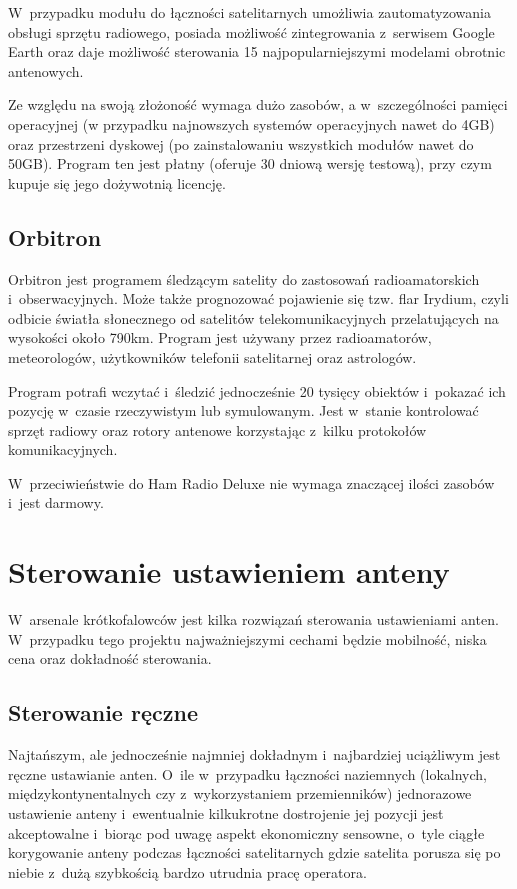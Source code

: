 \documentclass[eng,oneside]{mgr}
\begin{document}
			W~przypadku modułu do łączności satelitarnych umożliwia zautomatyzowania obsługi sprzętu radiowego, posiada możliwość zintegrowania z~serwisem Google Earth oraz daje możliwość sterowania 15 najpopularniejszymi modelami obrotnic antenowych.

			Ze względu na swoją złożoność wymaga dużo zasobów, a w~szczególności pamięci operacyjnej (w przypadku najnowszych systemów operacyjnych nawet do 4GB) oraz przestrzeni dyskowej (po zainstalowaniu wszystkich modułów nawet do 50GB). Program ten jest płatny (oferuje 30 dniową wersję testową), przy czym kupuje się jego dożywotnią licencję.

			\subsection{Orbitron}
			Orbitron jest programem śledzącym satelity do zastosowań radioamatorskich i~obserwacyjnych. Może także prognozować pojawienie się tzw. flar Irydium, czyli odbicie światła słonecznego od satelitów telekomunikacyjnych przelatujących na wysokości około 790km. Program jest używany przez radioamatorów, meteorologów, użytkowników telefonii satelitarnej oraz astrologów.

			Program potrafi wczytać i~śledzić jednocześnie 20 tysięcy obiektów i~pokazać ich pozycję w~czasie rzeczywistym lub symulowanym. Jest w~stanie kontrolować sprzęt radiowy oraz rotory antenowe korzystając z~kilku protokołów komunikacyjnych.

			W~przeciwieństwie do Ham Radio Deluxe nie wymaga znaczącej ilości zasobów i~jest darmowy.

		\section{Sterowanie ustawieniem anteny}
		W~arsenale krótkofalowców jest kilka rozwiązań sterowania ustawieniami anten. W~przypadku tego projektu najważniejszymi cechami będzie mobilność, niska cena oraz dokładność sterowania.

			\subsection{Sterowanie ręczne}
			Najtańszym, ale jednocześnie najmniej dokładnym i~najbardziej uciążliwym jest ręczne ustawianie anten. O~ile w~przypadku łączności naziemnych (lokalnych, międzykontynentalnych czy z~wykorzystaniem przemienników) jednorazowe ustawienie anteny i~ewentualnie kilkukrotne dostrojenie jej pozycji jest akceptowalne i~biorąc pod uwagę aspekt ekonomiczny sensowne, o~tyle ciągłe korygowanie anteny podczas łączności satelitarnych gdzie satelita porusza się po niebie z~dużą szybkością bardzo utrudnia pracę operatora.
\end{document}
